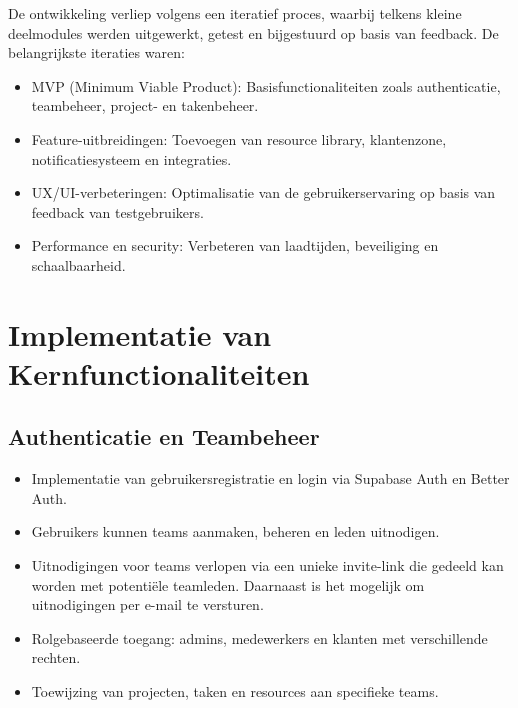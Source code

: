 De ontwikkeling verliep volgens een iteratief proces, waarbij telkens kleine deelmodules werden uitgewerkt, getest en bijgestuurd op basis van feedback. De belangrijkste iteraties waren:
\begin{itemize}
    \item MVP (Minimum Viable Product): Basisfunctionaliteiten zoals authenticatie, teambeheer, project- en takenbeheer.
    \item Feature-uitbreidingen: Toevoegen van resource library, klantenzone, notificatiesysteem en integraties.
    \item UX/UI-verbeteringen: Optimalisatie van de gebruikerservaring op basis van feedback van testgebruikers.
    \item Performance en security: Verbeteren van laadtijden, beveiliging en schaalbaarheid.
\end{itemize}

\section{Implementatie van Kernfunctionaliteiten}
\label{sec:implementatie-kern}

\subsection{Authenticatie en Teambeheer}
\begin{itemize}
    \item Implementatie van gebruikersregistratie en login via Supabase Auth en Better Auth.
    \item Gebruikers kunnen teams aanmaken, beheren en leden uitnodigen.
    \item Uitnodigingen voor teams verlopen via een unieke invite-link die gedeeld kan worden met potentiële teamleden. Daarnaast is het mogelijk om uitnodigingen per e-mail te versturen.
    \item Rolgebaseerde toegang: admins, medewerkers en klanten met verschillende rechten.
    \item Toewijzing van projecten, taken en resources aan specifieke teams.
\end{itemize}

